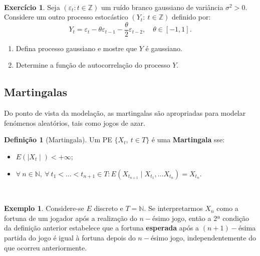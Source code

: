 \documentclass[
  11pt,
  a4paper,
]{book}
\theoremstyle{definition}
\newtheorem{definition}{Definição}[chapter]
\theoremstyle{definition}
\newtheorem{example}{Exemplo}[chapter]
\theoremstyle{definition}
\newtheorem{exercise}{Exercício}[chapter]
\theoremstyle{definition}
\theoremstyle{remark}
\begin{document}
\(\,\)

\begin{exercise}

Seja \((\varepsilon_t: t \in \mathbb{Z})\) um ruído branco gaussiano de variância \(\sigma^2>0\). Considere um outro processo estocástico \((Y_t: ~t \in \mathbb{Z})\) definido por:
\[Y_t=\varepsilon_t -\theta \varepsilon_{t-1}-\dfrac{\theta}{2}\varepsilon_{t-2}, \quad \theta \in [-1,1].\]

\begin{enumerate}
\def\labelenumi{(\alph{enumi})}
\item
  Defina processo gaussiano e mostre que \(Y\) é gaussiano.
\item
  Determine a função de autocorrelação do processo \(Y\).
\end{enumerate}

\end{exercise}

\subsection{Martingalas}\label{martingalas}

Do ponto de vista da modelação, as martingalas são apropriadas para modelar fenómenos aleatórios, tais como jogos de azar.

\begin{definition}[Martingala]

Um PE \(\{X_t, ~ t \in T\}\) é uma \textbf{Martingala} sse:

\begin{itemize}
\item
  \(E(\mid X_t \mid) < +\infty;\)
\item
  \(\forall ~n \in \mathbb{N}, ~\forall ~t_1< \ldots < t_{n+1} \in T: E(X_{t_{n+1}} \mid X_{t_1}, \ldots X_{t_n})=X_{t_n}\).
\end{itemize}

\end{definition}

\(\,\)

\begin{example}
Considere-se \(E\) discreto e \(T=\mathbb{N}\). Se interpretarmos \(X_n\) como a fortuna de um jogador após a realização do \(n-\)ésimo jogo, então a 2ª condição da definição anterior estabelece que a fortuna \textbf{esperada} após a \((n+1)-\)ésima partida do jogo é igual à fortuna depois do \(n-\)ésimo jogo, independentemente do que ocorreu anteriormente.
\end{example}
\end{document}
